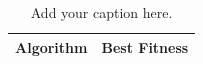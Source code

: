 
\begin{table}[t]
    \centering

    \caption{
        \label{tab:example}
        Add your caption here.
    }

    \begin{tabular}{lr}
        \toprule
            {\bf Algorithm}  &
            {\bf Best Fitness}
            \\
        \midrule

        

        \bottomrule
    \end{tabular}
\end{table}
